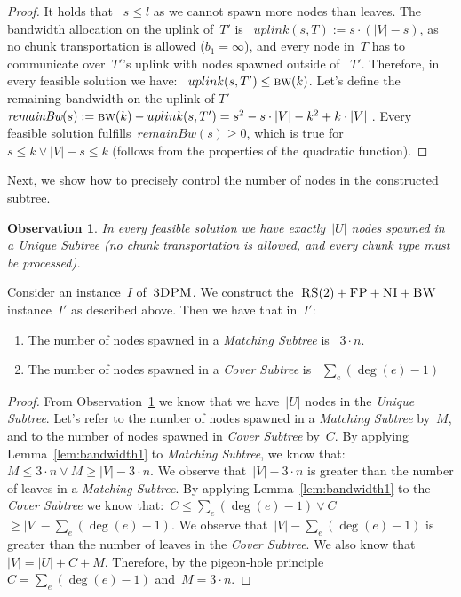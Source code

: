 \documentclass[preprint,12pt]{elsarticle}
\newcommand{\CC}{\textsc{NI}}
\newcommand{\FP}{\textsc{FP}}
\newcommand{\RS}{\textsc{RS}}
\newcommand{\BW}{\textsc{BW}}
\newcommand{\TDPM}{\textsc{3DPM}}
\newcommand{\numNodes}{\ensuremath{|V|}}
\newcommand{\UnqSubtree}{{{\emph{Unique Subtree}}}}
\newcommand{\MatchSubtree}{{\emph{Matching Subtree}}}
\newcommand{\CoverSubtree}{{\emph{Cover Subtree}}}
\newcommand{\remainBw}{\textit{remainBw}}
\newcommand{\Band}{\textsc{bw}}
\newtheorem{obs}{Observation}
\newcommand{\CostTrans}{\ensuremath{b_1}}
\begin{document}
\begin{proof}
It holds that ~$s\leq l$ as we cannot spawn more nodes than leaves.
  The bandwidth allocation on the uplink of~$T'$ is
 ~$uplink(s,T) := s\cdot (\numNodes - s)$, as no chunk transportation
  is allowed ($\CostTrans = \infty$), and every node in~$T$ has to
  communicate over~$T'$'s uplink with nodes spawned outside of
 ~$T'$. Therefore, in every feasible solution we have:
 ~$uplink(s, T') \leq \Band(k)$.  Let's define the remaining bandwidth
  on the uplink of $T'$~$\remainBw(s) := \Band(k)-uplink(s, T') = s^2 - s\cdot \numNodes -
  k^2+k\cdot \numNodes~$.
  Every feasible solution fulfills~$\remainBw(s) \geq 0$, which is true for
 ~$s \leq k \vee \numNodes-s\leq k$ (follows from the properties of the
  quadratic function).
\end{proof}


Next, we show how to precisely control the number of nodes in the
constructed subtree.

\begin{obs}
  In every feasible solution we have exactly~$|U|$ nodes spawned in a
  {\UnqSubtree} (no chunk transportation is allowed, and every chunk
  type must be processed).
  \label{obs:unq-full}
\end{obs}


\begin{lemma}
  Consider an instance~$I$ of~$\TDPM$. We construct the~$\RS(2)+\FP+\CC+\BW$ instance~$I'$
 as described above. Then we have that in~$I'$:
  \begin{enumerate}
    \item The number of nodes spawned in a {\MatchSubtree} is
   ~$3\cdot n$.
    \item The number of nodes spawned in a {\CoverSubtree} is
   ~$\sum_e(\deg(e)-1)$
  \end{enumerate}

  \label{lem:bandwidth2}
\end{lemma}

\begin{proof}
  From Observation~\ref{obs:unq-full} we know that we have~$|U|$ nodes
  in the {\UnqSubtree}. Let's refer to the number of nodes spawned in
  a {\MatchSubtree} by~$M$, and to the number of nodes spawned in
  {\CoverSubtree} by~$C$. By applying Lemma~\ref{lem:bandwidth1} to
  {\MatchSubtree}, we know that: $ M \leq 3\cdot n \vee M \geq |V| - 3\cdot n$.
  We observe that~$|V| - 3\cdot n$ is greater than the number of
  leaves in a {\MatchSubtree}.  By applying Lemma~\ref{lem:bandwidth1}
  to the {\CoverSubtree} we know that:~$ C \leq \sum_e(\deg(e)-1) \vee C$ $\geq |V| - \sum_e(\deg(e)-1)$.
  We observe that~$|V| - \sum_e(\deg(e)-1)$ is greater than the number
  of leaves in the {\CoverSubtree}.
  We also know that~$|V| = |U| + C + M$. Therefore, by the pigeon-hole principle
 ~$C = \sum_e(\deg(e)-1)$ and~$M = 3\cdot n$.
\end{proof}
\end{document}
